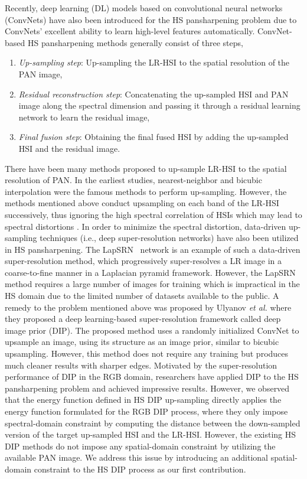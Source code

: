 \documentclass[journal]{IEEEtran}
\begin{document}
\par Recently, deep learning (DL) models based on convolutional neural networks (ConvNets) have also been introduced for the HS pansharpening problem due to ConvNets' excellent ability to learn high-level features automatically.  ConvNet-based HS pansharpening methods generally consist of three steps, 
\begin{enumerate}
    \item \textit{Up-sampling step}: Up-sampling the LR-HSI to the spatial resolution of the PAN image, 
    \item \textit{Residual reconstruction step}: Concatenating the up-sampled HSI and PAN image along the spectral dimension and passing it through a residual learning network to learn the residual image,
    \item \textit{Final fusion step}: Obtaining the final fused HSI by adding the up-sampled HSI and the residual image.
\end{enumerate}

\par There have been many  methods proposed to up-sample LR-HSI to the spatial resolution of PAN. In the earliest studies, nearest-neighbor and bicubic interpolation were the famous methods to perform up-sampling. However, the methods mentioned above conduct upsampling on each band of the LR-HSI successively, thus ignoring the high spectral correlation of HSIs which may lead to spectral distortions \cite{DHP-DARN, DeepImagePrior}. In order to minimize the spectral distortion, data-driven up-sampling techniques (i.e., deep super-resolution networks) have also been utilized in HS pansharpening. The LapSRN~\cite{LapSRN} network is an example of such a data-driven super-resolution method, which progressively super-resolves a LR image in a coarse-to-fine manner in a Laplacian pyramid framework. However, the LapSRN method requires a large number of images for training which is impractical in the HS domain due to the limited number of datasets available to the public.  A remedy to the problem mentioned above was proposed by Ulyanov \textit{et al.} \cite{DeepImagePrior} where they proposed a deep learning-based super-resolution framework called deep image prior (DIP). The proposed method uses a randomly initialized ConvNet to upsample an image, using its structure as an image prior, similar to bicubic upsampling. However, this method does not require any training but produces much cleaner results with sharper edges. Motivated by the super-resolution performance of DIP in the RGB domain, researchers have applied DIP to the HS pansharpening problem \cite{DeepHyperspectralPrior, DHP-DARN} and achieved impressive results. However, we observed that the energy function defined in HS DIP up-sampling directly applies the energy function formulated for the RGB DIP process, where they only impose spectral-domain constraint by computing the  distance between the down-sampled version of the target up-sampled HSI and the LR-HSI. However, the existing HS DIP methods do not impose any spatial-domain constraint by utilizing the available PAN image. We address this issue by introducing an additional spatial-domain constraint to the HS DIP process as our first contribution.
\end{document}
